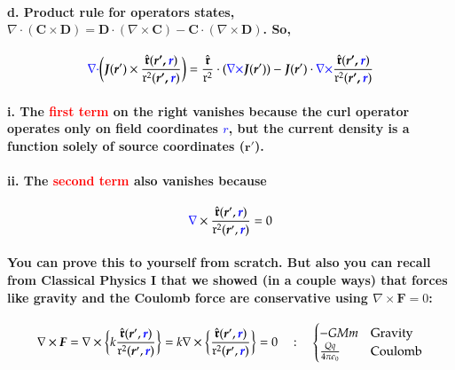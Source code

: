 \documentclass{article}
\begin{document}
\paragraph{\indent d. Product rule for operators states, $\nabla\cdot(\boldsymbol{C}\times\boldsymbol{D})=\boldsymbol{D}\cdot(\nabla\times\boldsymbol{C})-\boldsymbol{C}\cdot(\nabla\times\boldsymbol{D})$. So,}
\begin{equation*}
    \textcolor{blue}{\nabla\cdot}\bigg(\boldsymbol{J}(\boldsymbol{r}')\times\frac{\hat{\boldsymbol{\mathfrak{r}}}(\boldsymbol{r',\textcolor{blue}{r}})}{\mathfrak{r}^2(\boldsymbol{r',\textcolor{blue}{r}})}\bigg)=\frac{\hat{\boldsymbol{\mathfrak{r}}}}{\mathfrak{r}^2}\cdot(\textcolor{blue}{\nabla\times}\boldsymbol{J}(\boldsymbol{r}'))-\boldsymbol{J}(\boldsymbol{r}')\cdot\textcolor{blue}{\nabla\times}\frac{\hat{\boldsymbol{\mathfrak{r}}}(\boldsymbol{r',\textcolor{blue}{r}})}{\mathfrak{r}^2(\boldsymbol{r',\textcolor{blue}{r}})}
\end{equation*}
\paragraph{\indent\indent i. The \textcolor{red}{first term} on the right vanishes because the curl operator operates only on field coordinates \textcolor{blue}{$r$}, but the current density is a function solely of source coordinates ($\boldsymbol{r}'$).}
\paragraph{\indent\indent ii. The \textcolor{red}{second term} also vanishes because}
\begin{equation*}
    \textcolor{blue}{\nabla}\times\frac{\hat{\boldsymbol{\mathfrak{r}}}(\boldsymbol{r}',\textcolor{blue}{\boldsymbol{r}})}{\mathfrak{r}^2(\boldsymbol{r}',\textcolor{blue}{\boldsymbol{r}})}=0
\end{equation*}
\paragraph{You can prove this to yourself from scratch. But also you can recall from Classical Physics I that we showed (in a couple ways) that forces like gravity and the Coulomb force are conservative using $\nabla\times\boldsymbol{F}=0$:}
\begin{equation*}
    \nabla\times\boldsymbol{F}=\nabla\times\bigg\{ k\frac{\hat{\boldsymbol{\mathfrak{r}}}(\boldsymbol{r}',\textcolor{blue}{\boldsymbol{r}})}{\mathfrak{r}^2(\boldsymbol{r}',\textcolor{blue}{\boldsymbol{r}})}\bigg\}=k\nabla\times\bigg\{ \frac{\hat{\boldsymbol{\mathfrak{r}}}(\boldsymbol{r}',\textcolor{blue}{\boldsymbol{r}})}{\mathfrak{r}^2(\boldsymbol{r}',\textcolor{blue}{\boldsymbol{r}})}\bigg\} =0 \quad: \quad\begin{cases}
        -GMm & \text{Gravity}\\
        \frac{Qq}{4\pi\epsilon_0} & \text{Coulomb}\\
    \end{cases}
\end{equation*}
\end{document}
